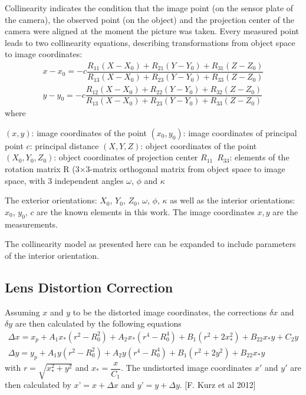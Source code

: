 Collinearity indicates the condition that the image point (on the sensor plate of the camera), the observed point (on the object) and the projection center of the camera were aligned at the moment the picture was taken. Every measured point leads to two collinearity equations, describing transformations from object space to image coordinates:
\begin{equation} %
\begin{split}
x - x_0 = -c \dfrac {R_{11}(X-X_0) + R_{21}(Y-Y_0) + R_{31}(Z-Z_0)} {R_{13}(X-X_0) + R_{23}(Y-Y_0) + R_{33}(Z-Z_0)} \\
y - y_0 = -c \dfrac {R_{12}(X-X_0) + R_{22}(Y-Y_0) + R_{32}(Z-Z_0)} {R_{13}(X-X_0) + R_{23}(Y-Y_0) + R_{33}(Z-Z_0)}
\end{split}
\end{equation}
where\newline

$(x, y)$: image coordinates of the point \newline
$(x_0, y_0)$: image coordinates of principal point \newline
$c$: principal distance \newline
$(X, Y, Z)$: object coordinates of the point \newline
$(X_0, Y_0, Z_0)$: object coordinates of projection center \newline
$R_{11}$~$R_{33}$: elements of the rotation matrix R (3$\times$3-matrix orthogonal matrix from object space to image space, with 3 independent angles $\omega$, $\phi$ and $\kappa$\newline

The exterior orientations: $X_0$, $Y_0$, $Z_0$, $\omega$, $\phi$, $\kappa$ as well as the interior orientations: $x_0$, $y_0$, $c$ are the known elements in this work. The image coordinates $x,y$ are the measurements.


The collinearity model as presented here can be expanded to include parameters of
the interior orientation.

\subsection{Lens Distortion Correction}
\label{subsec:2.2.2.LensDistortion}

Assuming $x$ and $y$ to be the distorted image coordinates, the corrections $\delta x$ and $\delta y$ are then calculated by the following equations
\begin{equation} %
\begin{aligned}
\Delta x = x_p + A_1x_*(r^2-R_0^2) + A_2x_*(r^4-R_0^4) + B_1(r^2+2x_*^2) + B_22x_*y+C_2y \\
\Delta y = y_p + A_1y  (r^2-R_0^2) + A_2y  (r^4-R_0^4) + B_1(r^2+2y^2)   + B_22x_*y
\end{aligned}
\end{equation}
with $r=\sqrt{x_*^2+y^2}$ and $x_*=\dfrac{x}{C_1}$. The undistorted image coordinates $x\prime$ and $y\prime$ are then calculated by $x’=x+\Delta x$ and $y’=y+\Delta y$. [F. Kurz et al 2012] 



